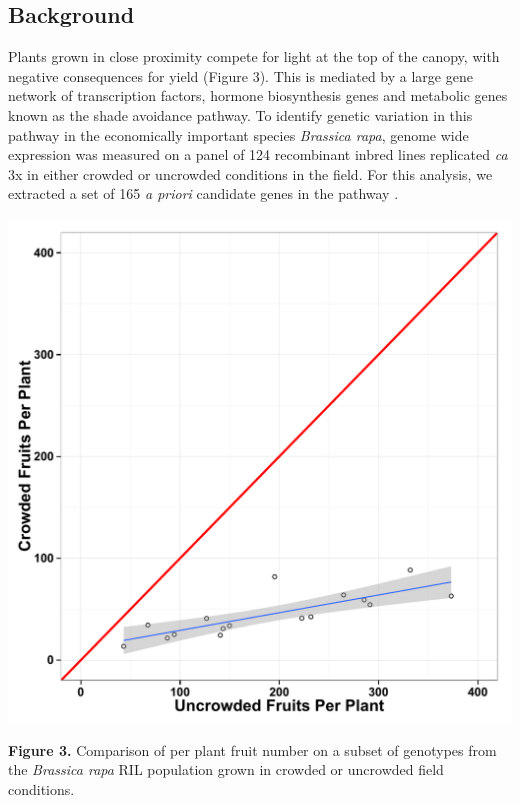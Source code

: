 \documentclass[landscape,paperwidth=48in,paperheight=36in,fontscale=0.35]{baposter}
\begin{document}
\begin{poster}
{\begin{multicols}{2}
\subsection*{Background} 
Plants grown in close proximity compete for light at the top of the canopy, with negative consequences for yield (Figure 3). This is mediated by a large gene network of transcription factors, hormone biosynthesis genes and metabolic genes known as the shade avoidance pathway. To identify genetic variation in this pathway in the economically important species \emph{Brassica rapa}, genome wide expression was measured on a panel of 124 recombinant inbred lines replicated \emph{ca} 3x in either crowded or uncrowded conditions in the field. For this analysis, we extracted a set of 165 \emph{a priori} candidate genes in the pathway \citep{Nozue:2015dt}.
\begin{center}
\includegraphics[width=1\columnwidth]{UN_CR_Fruit_regression.pdf} 
\end{center}
\textbf{Figure 3.} Comparison of per plant fruit number on a subset of genotypes from the \emph{Brassica rapa} RIL population grown in crowded or uncrowded field conditions.
\end{multicols}

}
\end{poster}
\end{document}
